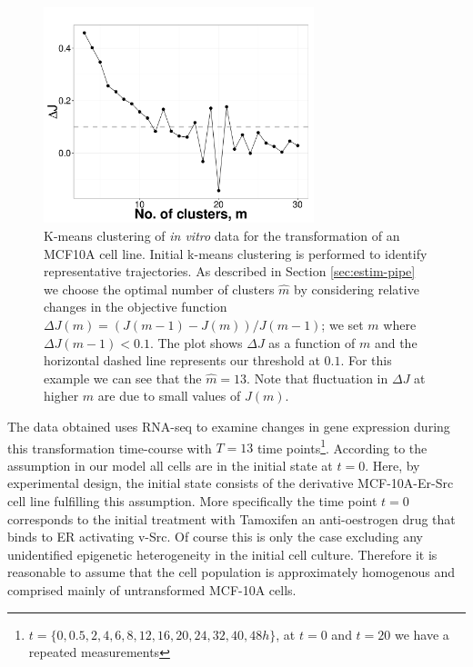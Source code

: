 \begin{figure}
  \centering
  \includegraphics[width=0.7\textwidth]{pics/kmeans-dat.pdf}
  \caption{K-means clustering of {\it in vitro} data for the transformation of an MCF10A cell line. Initial k-means clustering is performed to identify representative trajectories. As described in Section \ref{sec:estim-pipe} we choose the optimal number of clusters $\hat{m}$ by considering relative changes in the objective function $\Delta J (m) = (J(m-1) - J(m))/J(m-1)$; we set $m$ where $\Delta J(m-1) < 0.1$. The plot shows $\Delta J$ as a function of $m$ and the horizontal dashed line represents our threshold at $0.1$. For this example we can see that the $\hat{m} = 13$. Note that fluctuation in $\Delta J$ at higher $m$ are due to small values of $J(m)$. }
  \label{fig:kmeans-dat}
\end{figure}

The data obtained uses RNA-seq to examine changes in gene expression during this transformation time-course with $T=13$ time points\footnote{$t=\lbrace 0, 0.5,  2,  4,  6,  8, 12, 16, 20, 24, 32, 40, 48h \rbrace$, at $t=0$ and $t=20$ we have a repeated measurements}. According to the assumption in our model all cells are in the initial state at $t=0$. Here, by experimental design, the initial state consists of the derivative MCF-10A-Er-Src cell line fulfilling this assumption. More specifically the time point $t=0$ corresponds to the initial treatment with Tamoxifen an anti-oestrogen drug that binds to ER activating v-Src. Of course this is only the case excluding any unidentified epigenetic heterogeneity in the initial cell culture.  Therefore it is reasonable to assume that the cell population is approximately homogenous and comprised mainly of untransformed MCF-10A cells.



